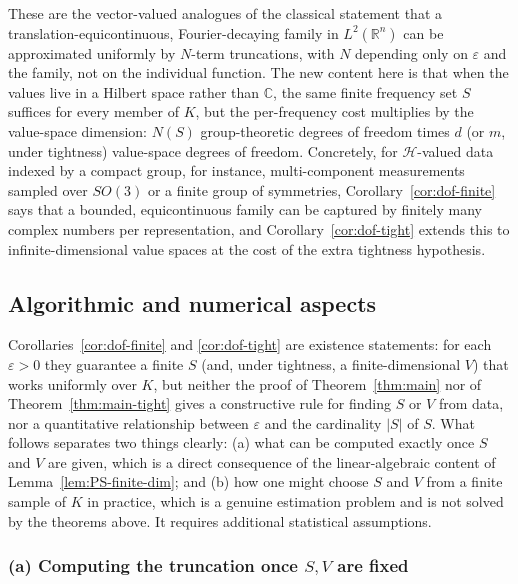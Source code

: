 \documentclass[11pt]{amsart}
\begin{document}
These are the vector-valued analogues of the classical statement that a
translation-equicontinuous, Fourier-decaying family in $L^2(\mathbb{R}^n)$
can be approximated uniformly by $N$-term truncations, with $N$ depending
only on $\varepsilon$ and the family, not on the individual function. The
new content here is that when the values live in a Hilbert space rather
than $\mathbb{C}$, the same finite frequency set $S$ suffices for
every member of $K$, but the per-frequency cost multiplies by the
value-space dimension: $N(S)$ group-theoretic degrees of freedom times $d$
(or $m$, under tightness) value-space degrees of freedom. Concretely, for
$\mathcal{H}$-valued data indexed by a compact group, for instance,
multi-component measurements sampled over $SO(3)$ or a finite group of
symmetries,  Corollary~\ref{cor:dof-finite} says that a bounded,
equicontinuous family can be captured by finitely many complex numbers per
representation, and Corollary~\ref{cor:dof-tight} extends this to
infinite-dimensional value spaces at the cost of the extra tightness
hypothesis.

\subsection*{Algorithmic and numerical aspects}

Corollaries~\ref{cor:dof-finite} and \ref{cor:dof-tight} are existence
statements: for each $\varepsilon>0$ they guarantee a finite $S$ (and,
under tightness, a finite-dimensional $V$) that works uniformly over $K$,
but neither the proof of Theorem~\ref{thm:main} nor of Theorem~\ref{thm:main-tight} gives a
constructive rule for finding $S$ or $V$ from data, nor a quantitative
relationship between $\varepsilon$ and the cardinality  $|S|$ of $S$. What follows separates two
things clearly: (a) what can be computed exactly once $S$ and $V$ are
given, which is a direct consequence of the linear-algebraic content
of Lemma~\ref{lem:PS-finite-dim}; and (b) how one might
choose $S$ and $V$ from a finite sample of $K$ in practice, which is a
genuine estimation problem and is not solved by the theorems above. It requires additional statistical assumptions.

\subsubsection*{(a) Computing the truncation once $S,V$ are fixed}
\end{document}
